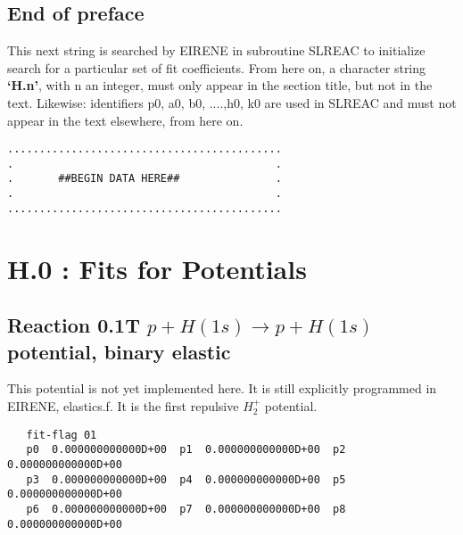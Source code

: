 \documentclass[12pt,dvipdfmx]{article}
\begin{document}
\subsection{End of preface}
This next string is searched by EIRENE in subroutine SLREAC
to initialize search for a particular set of fit coefficients.
From here on, a character string \textbf{`H.n'}, with n an integer, must only appear in the
section title,
but not in the text. Likewise: identifiers p0, a0, b0, ....,h0, k0 are used
in SLREAC and must not
appear in the text elsewhere, from here on.

\bigskip
\begin{small}\begin{verbatim}
...........................................
.                                         .
.       ##BEGIN DATA HERE##               .
.                                         .
...........................................
\end{verbatim}\end{small}
\newpage
\renewcommand{\theHsection}{arabicsection.\thesection}
\renewcommand\thesection{\arabic{section}}
\setcounter{section}{-1}
\section{H.0 :  Fits for Potentials}\label{secpot}

\subsection{
Reaction 0.1T $ p + H(1s) \rightarrow p + H(1s) $ potential, binary elastic }
This potential is not yet implemented here. It is still explicitly
programmed in EIRENE, elastics.f. It is the first repulsive $H_2^+$
potential.

\begin{small}\begin{verbatim}
   fit-flag 01
   p0  0.000000000000D+00  p1  0.000000000000D+00  p2  0.000000000000D+00
   p3  0.000000000000D+00  p4  0.000000000000D+00  p5  0.000000000000D+00
   p6  0.000000000000D+00  p7  0.000000000000D+00  p8  0.000000000000D+00
\end{verbatim}\end{small}
\end{document}
